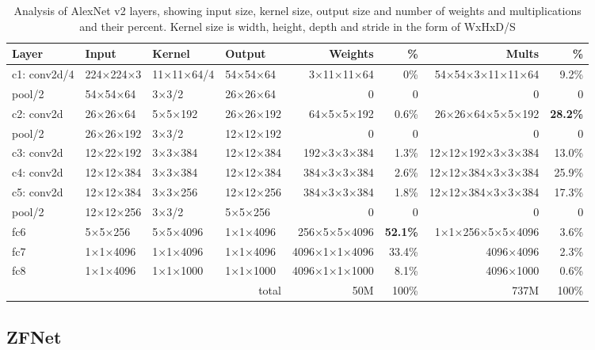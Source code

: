 \clearpage
\begin{landscape}
\clearpage
\centering

\begin{table*}\caption{Analysis of AlexNet v2 layers, showing input size, kernel size, output size and number of weights and multiplications and their percent. Kernel size is width, height, depth and stride in the form of WxHxD/S}\label{table:alexnet-cnn}
\centering
\begin{tabularx}{\hsize}{Xlllrrrr}
\toprule
Layer & Input & Kernel & Output & Weights & \% & Mults & \% \\
\midrule
c1: conv2d/4 & 224×224×3 & 11×11×64/4 & 54×54×64 & 3×11×11×64 & 0\% & 54×54×3×11×11×64 & 9.2\% \\
pool/2 & 54×54×64 & 3×3/2 & 26×26×64 & 0 & 0 & 0 & 0 \\
c2: conv2d & 26×26×64 & 5×5×192 & 26×26×192 & 64×5×5×192 & 0.6\% & 26×26×64×5×5×192 &  \textbf{28.2\%} \\
pool/2 & 26×26×192 & 3×3/2 & 12×12×192 & 0 & 0 & 0 & 0 \\
c3: conv2d & 12×22×192 & 3×3×384 & 12×12×384 & 192×3×3×384 & 1.3\% & 12×12×192×3×3×384 & 13.0\% \\
c4: conv2d & 12×12×384 & 3×3×384 & 12×12×384 & 384×3×3×384 & 2.6\% & 12×12×384×3×3×384 & 25.9\% \\
c5: conv2d & 12×12×384 & 3×3×256 & 12×12×256 & 384×3×3×384 & 1.8\% & 12×12×384×3×3×384 & 17.3\% \\
pool/2 & 12×12×256 & 3×3/2 & 5×5×256 & 0 & 0 & 0 & 0 \\
fc6 & 5×5×256  & 5×5×4096 & 1×1×4096 & 256×5×5×4096 &  \textbf{52.1\%} & 1×1×256×5×5×4096 & 3.6\% \\
fc7 & 1×1×4096 & 1×1×4096 & 1×1×4096 & 4096×1×1×4096 & 33.4\% & 4096×4096 & 2.3\% \\
fc8 & 1×1×4096 & 1×1×1000 & 1×1×1000 & 4096×1×1×1000 & 8.1\% & 4096×1000 & 0.6\% \\
\cmidrule{5-8}
\multicolumn{4}{r}{total} & 50M & 100\% & 737M & 100\% \\
\bottomrule
\end{tabularx}
\end{table*}

\end{landscape}
\clearpage

\subsection{ZFNet}

